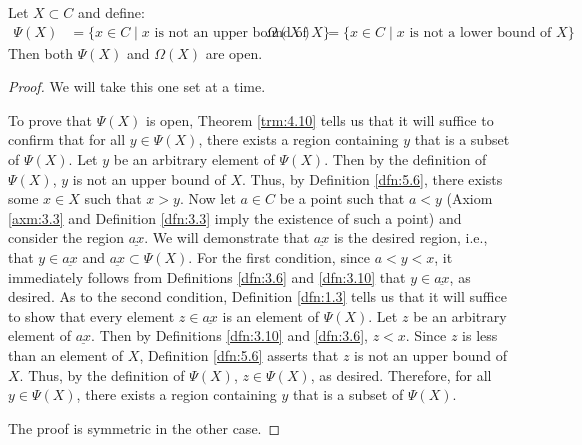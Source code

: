 \documentclass[../main.tex]{subfiles}
\begin{document}
\begin{lemma}\label{lem:5.16}
    Let $X\subset C$ and define:
    \begin{align*}
        \Psi(X) &= \{x\in C\mid x\text{ is not an upper bound of }X\}&
        \Omega(X) &= \{x\in C\mid x\text{ is not a lower bound of }X\}
    \end{align*}
    Then both $\Psi(X)$ and $\Omega(X)$ are open.
    \begin{proof}
        We will take this one set at a time.\par
        To prove that $\Psi(X)$ is open, Theorem \ref{trm:4.10} tells us that it will suffice to confirm that for all $y\in\Psi(X)$, there exists a region containing $y$ that is a subset of $\Psi(X)$. Let $y$ be an arbitrary element of $\Psi(X)$. Then by the definition of $\Psi(X)$, $y$ is not an upper bound of $X$. Thus, by Definition \ref{dfn:5.6}, there exists some $x\in X$ such that $x>y$. Now let $a\in C$ be a point such that $a<y$ (Axiom \ref{axm:3.3} and Definition \ref{dfn:3.3} imply the existence of such a point) and consider the region $\underline{ax}$. We will demonstrate that $\underline{ax}$ is the desired region, i.e., that $y\in\underline{ax}$ and $\underline{ax}\subset\Psi(X)$. For the first condition, since $a<y<x$, it immediately follows from Definitions \ref{dfn:3.6} and \ref{dfn:3.10} that $y\in\underline{ax}$, as desired. As to the second condition, Definition \ref{dfn:1.3} tells us that it will suffice to show that every element $z\in\underline{ax}$ is an element of $\Psi(X)$. Let $z$ be an arbitrary element of $\underline{ax}$. Then by Definitions \ref{dfn:3.10} and \ref{dfn:3.6}, $z<x$. Since $z$ is less than an element of $X$, Definition \ref{dfn:5.6} asserts that $z$ is not an upper bound of $X$. Thus, by the definition of $\Psi(X)$, $z\in\Psi(X)$, as desired. Therefore, for all $y\in\Psi(X)$, there exists a region containing $y$ that is a subset of $\Psi(X)$.\par
        The proof is symmetric in the other case.
    \end{proof}
\end{lemma}
\end{document}

